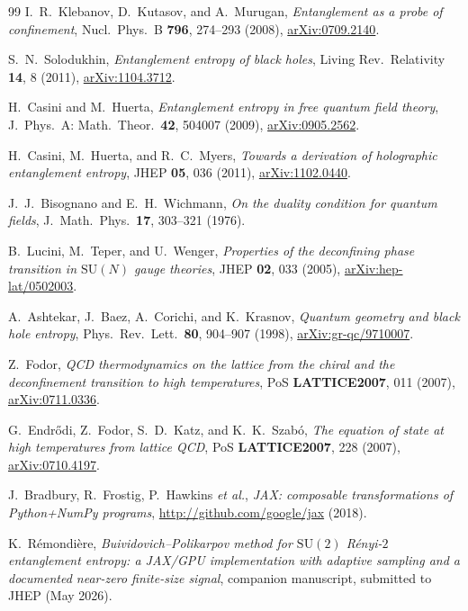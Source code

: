 \documentclass[11pt,a4paper]{article}
\theoremstyle{definition}
\begin{document}
\begin{thebibliography}{99}
I.~R.~Klebanov, D.~Kutasov, and A.~Murugan,
\emph{Entanglement as a probe of confinement},
Nucl.\ Phys.\ B \textbf{796}, 274--293 (2008),
\href{https://arxiv.org/abs/0709.2140}{arXiv:0709.2140}.

S.~N.~Solodukhin,
\emph{Entanglement entropy of black holes},
Living Rev.\ Relativity \textbf{14}, 8 (2011),
\href{https://arxiv.org/abs/1104.3712}{arXiv:1104.3712}.

H.~Casini and M.~Huerta,
\emph{Entanglement entropy in free quantum field theory},
J.\ Phys.\ A: Math.\ Theor.\ \textbf{42}, 504007 (2009),
\href{https://arxiv.org/abs/0905.2562}{arXiv:0905.2562}.

H.~Casini, M.~Huerta, and R.~C.~Myers,
\emph{Towards a derivation of holographic entanglement entropy},
JHEP \textbf{05}, 036 (2011),
\href{https://arxiv.org/abs/1102.0440}{arXiv:1102.0440}.

J.~J.~Bisognano and E.~H.~Wichmann,
\emph{On the duality condition for quantum fields},
J.\ Math.\ Phys.\ \textbf{17}, 303--321 (1976).

B.~Lucini, M.~Teper, and U.~Wenger,
\emph{Properties of the deconfining phase transition in
$\mathrm{SU}(N)$ gauge theories},
JHEP \textbf{02}, 033 (2005),
\href{https://arxiv.org/abs/hep-lat/0502003}{arXiv:hep-lat/0502003}.

A.~Ashtekar, J.~Baez, A.~Corichi, and K.~Krasnov,
\emph{Quantum geometry and black hole entropy},
Phys.\ Rev.\ Lett.\ \textbf{80}, 904--907 (1998),
\href{https://arxiv.org/abs/gr-qc/9710007}{arXiv:gr-qc/9710007}.

Z.~Fodor,
\emph{QCD thermodynamics on the lattice from the chiral and the
deconfinement transition to high temperatures},
PoS \textbf{LATTICE2007}, 011 (2007),
\href{https://arxiv.org/abs/0711.0336}{arXiv:0711.0336}.

G.~Endr\H{o}di, Z.~Fodor, S.~D.~Katz, and K.~K.~Szab\'o,
\emph{The equation of state at high temperatures from lattice QCD},
PoS \textbf{LATTICE2007}, 228 (2007),
\href{https://arxiv.org/abs/0710.4197}{arXiv:0710.4197}.

J.~Bradbury, R.~Frostig, P.~Hawkins \emph{et al.},
\emph{JAX: composable transformations of Python+NumPy programs},
\url{http://github.com/google/jax} (2018).

K.~R\'emondi\`ere,
\emph{Buividovich--Polikarpov method for $\mathrm{SU}(2)$ R\'enyi-$2$
entanglement entropy: a JAX/GPU implementation with adaptive
sampling and a documented near-zero finite-size signal},
companion manuscript, submitted to JHEP (May 2026).

\end{thebibliography}
\end{document}
